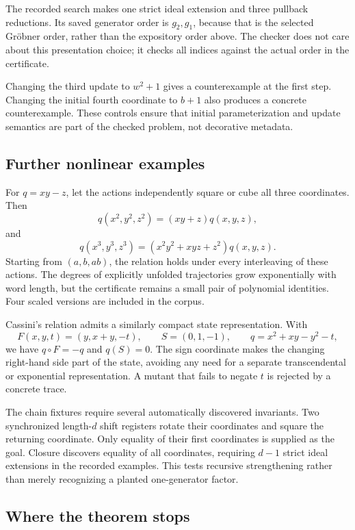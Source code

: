 The recorded search makes one strict ideal extension and three pullback
reductions. Its saved generator order is $g_2,g_1$, because that is the selected
Gr\"obner order, rather than the expository order above. The checker does not
care about this presentation choice; it checks all indices against the actual
order in the certificate.

Changing the third update to $w^2+1$ gives a counterexample at the first step.
Changing the initial fourth coordinate to $b+1$ also produces a concrete
counterexample. These controls ensure that initial parameterization and update
semantics are part of the checked problem, not decorative metadata.

\subsection{Further nonlinear examples}

For $q=xy-z$, let the actions independently square or cube all three coordinates.
Then
\[
 q(x^2,y^2,z^2)=(xy+z)q(x,y,z),
\]
and
\[
 q(x^3,y^3,z^3)=(x^2y^2+xyz+z^2)q(x,y,z).
\]
Starting from $(a,b,ab)$, the relation holds under every interleaving of these
actions. The degrees of explicitly unfolded trajectories grow exponentially
with word length, but the certificate remains a small pair of polynomial
identities. Four scaled versions are included in the corpus.

Cassini's relation admits a similarly compact state representation. With
\[
 F(x,y,t)=(y,x+y,-t),\qquad S=(0,1,-1),\qquad
 q=x^2+xy-y^2-t,
\]
we have $q\circ F=-q$ and $q(S)=0$. The sign coordinate makes the changing
right-hand side part of the state, avoiding any need for a separate
transcendental or exponential representation. A mutant that fails to negate
$t$ is rejected by a concrete trace.

The chain fixtures require several automatically discovered invariants.
Two synchronized length-$d$ shift registers rotate their coordinates and square
the returning coordinate. Only equality of their first coordinates is supplied
as the goal. Closure discovers equality of all coordinates, requiring $d-1$
strict ideal extensions in the recorded examples. This tests recursive
strengthening rather than merely recognizing a planted one-generator factor.

\subsection{Where the theorem stops}
\label{sec:ideal-limits}


